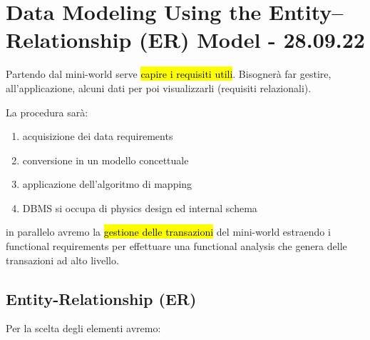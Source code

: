 
\section{Data Modeling Using the Entity–Relationship (ER) Model - 28.09.22}

Partendo dal mini-world serve \hl{capire i requisiti utili}. Bisognerà far gestire, all'applicazione, alcuni dati per poi visualizzarli (requisiti relazionali).

La procedura sarà:

\begin{enumerate}
	\item acquisizione dei data requirements
	\item conversione in un modello concettuale
	\item applicazione dell'algoritmo di mapping
	\item DBMS si occupa di physics design ed internal schema
\end{enumerate}

in parallelo avremo la \hl{gestione delle transazioni} del mini-world estraendo i functional requirements per effettuare una functional analysis che genera delle transazioni ad alto livello.


\subsection{Entity-Relationship (ER)}

Per la scelta degli elementi avremo:

